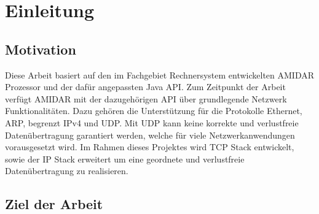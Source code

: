 \chapter{Einleitung}

\section{Motivation}

Diese Arbeit basiert auf den im Fachgebiet Rechnersystem entwickelten AMIDAR Prozessor und der dafür angepassten Java API. Zum Zeitpunkt der Arbeit verfügt AMIDAR mit der dazugehörigen API über grundlegende Netzwerk Funktionalitäten. Dazu gehören die Unterstützung für die Protokolle Ethernet, ARP, begrenzt IPv4 und UDP. Mit UDP kann keine korrekte und verlustfreie Datenübertragung garantiert werden, welche für viele Netzwerkanwendungen vorausgesetzt wird. Im Rahmen dieses Projektes wird TCP Stack entwickelt, sowie der IP Stack erweitert um eine geordnete und verlustfreie Datenübertragung zu realisieren. 


\section{Ziel der Arbeit}

